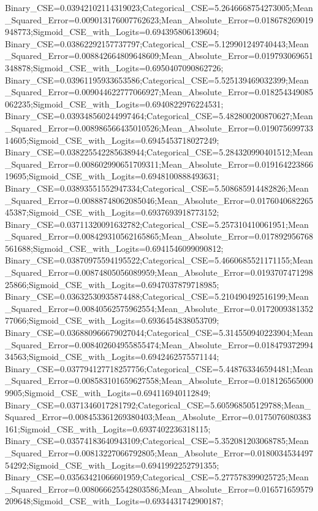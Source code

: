 Binary_CSE=0.03942102114319023;Categorical_CSE=5.2646668754273005;Mean_Squared_Error=0.009013176007762623;Mean_Absolute_Error=0.018678269019948773;Sigmoid_CSE_with_Logits=0.694395806139604;
Binary_CSE=0.03862292157737797;Categorical_CSE=5.129901249740443;Mean_Squared_Error=0.008842664809648609;Mean_Absolute_Error=0.019793069651348878;Sigmoid_CSE_with_Logits=0.6950407090862726;
Binary_CSE=0.03961195933653586;Categorical_CSE=5.525139469032399;Mean_Squared_Error=0.009044622777066927;Mean_Absolute_Error=0.018254349085062235;Sigmoid_CSE_with_Logits=0.6940822976224531;
Binary_CSE=0.039348560244997464;Categorical_CSE=5.482800200870627;Mean_Squared_Error=0.008986566435010526;Mean_Absolute_Error=0.01907569973314605;Sigmoid_CSE_with_Logits=0.6945453718027249;
Binary_CSE=0.038225542285638944;Categorical_CSE=5.284320990401512;Mean_Squared_Error=0.008602990651709311;Mean_Absolute_Error=0.01916422386619695;Sigmoid_CSE_with_Logits=0.6948100888493631;
Binary_CSE=0.03893551552947334;Categorical_CSE=5.508685914482826;Mean_Squared_Error=0.00888748062085046;Mean_Absolute_Error=0.017604068226545387;Sigmoid_CSE_with_Logits=0.6937693918773152;
Binary_CSE=0.03711320091632782;Categorical_CSE=5.257310410061951;Mean_Squared_Error=0.008429310562165865;Mean_Absolute_Error=0.017892956768561688;Sigmoid_CSE_with_Logits=0.6941546099090812;
Binary_CSE=0.03870975594195522;Categorical_CSE=5.4660685521171155;Mean_Squared_Error=0.00874805056089959;Mean_Absolute_Error=0.019370747129825866;Sigmoid_CSE_with_Logits=0.6947037879718985;
Binary_CSE=0.03632530935874488;Categorical_CSE=5.210490492516199;Mean_Squared_Error=0.00840562575962554;Mean_Absolute_Error=0.017200938135277066;Sigmoid_CSE_with_Logits=0.6936454838053709;
Binary_CSE=0.036880966679027044;Categorical_CSE=5.314550940223904;Mean_Squared_Error=0.008402604955855474;Mean_Absolute_Error=0.01847937299434563;Sigmoid_CSE_with_Logits=0.6942462575571144;
Binary_CSE=0.037794127718257756;Categorical_CSE=5.448763346594481;Mean_Squared_Error=0.008583101659627558;Mean_Absolute_Error=0.0181265650009905;Sigmoid_CSE_with_Logits=0.694116940112849;
Binary_CSE=0.0371346017281792;Categorical_CSE=5.605968505129788;Mean_Squared_Error=0.008453361269380403;Mean_Absolute_Error=0.0175076080383161;Sigmoid_CSE_with_Logits=0.6937402236318115;
Binary_CSE=0.03574183640943109;Categorical_CSE=5.352081203068785;Mean_Squared_Error=0.00813227066792805;Mean_Absolute_Error=0.018003453449754292;Sigmoid_CSE_with_Logits=0.6941992252791355;
Binary_CSE=0.03563421066601959;Categorical_CSE=5.277578399025725;Mean_Squared_Error=0.008066625542803586;Mean_Absolute_Error=0.016571659579209648;Sigmoid_CSE_with_Logits=0.6934431742900187;

